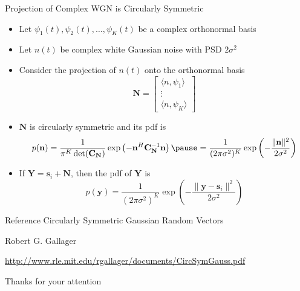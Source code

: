 \documentclass[t]{beamer}
\begin{document}
\begin{frame}{Projection of Complex WGN is Circularly Symmetric}
  \footnotesize
  \begin{itemize}
    \item \pause Let $\psi_1(t), \psi_2(t),\ldots,\psi_K(t)$ be a complex orthonormal basis
    \item \pause Let $n(t)$ be complex white Gaussian noise with PSD $2\sigma^2$
    \item \pause Consider the projection of $n(t)$ onto the orthonormal basis
      \begin{equation*}
        \mathbf{N} = \begin{bmatrix} \langle n, \psi_1 \rangle \\ \vdots \\ \langle n, \psi_K \rangle \end{bmatrix}
      \end{equation*}
    \item \pause $\mathbf{N}$ is circularly symmetric \pause and its pdf is
      \begin{equation*}
        p(\mathbf{n}) = \frac{1}{\pi^K\det(\mathbf{C}_{\mathbf{N}})} \exp\left(-\mathbf{n}^H\mathbf{C}_{\mathbf{N}}^{-1}\mathbf{n}\right) \pause = \frac{1}{(2\pi\sigma^2)^K} \exp\left(-\frac{\lVert \mathbf{n} \rVert^2}{2\sigma^2}\right)
      \end{equation*}
    \item \pause If $\mathbf{Y} = \mathbf{s}_i + \mathbf{N}$, then the pdf of $\mathbf{Y}$ is
      \begin{equation*}
        p(\mathbf{y}) = \frac{1}{(2\pi\sigma^2)^K} \exp\left(-\frac{\lVert \mathbf{y}-\mathbf{s}_i \rVert^2}{2\sigma^2}\right)
      \end{equation*}
  \end{itemize}
  \normalsize
\end{frame}

\begin{frame}{Reference}
    Circularly Symmetric Gaussian Random Vectors
    
    Robert G. Gallager
    
    \url{http://www.rle.mit.edu/rgallager/documents/CircSymGauss.pdf}
\end{frame}

\begin{frame}{}
\vfill
\begin{center}
Thanks for your attention
\end{center}
\vfill
\end{frame}
\end{document}
